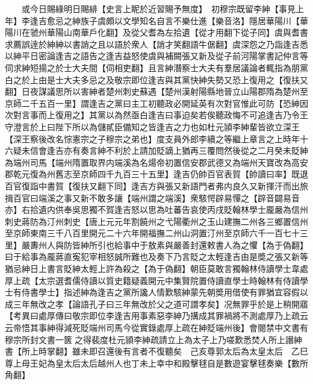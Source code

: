 　　或今日賜綠明日賜緋【史言上眤於近習賜予無度】　初穆宗既留李紳【事見上年】李逢吉愈忌之紳族子虞頗以文學知名自言不樂仕進【樂音洛】隱居華陽川【華陽川在虢州華陽山南華戶化翻】及從父耆為左拾遺【從才用翻下從子同】虞與耆書求薦誤逹於紳紳以書誚之且以語於衆人【誚才笑翻語牛倨翻】虞深怨之乃詣逢吉悉以紳平日密論逢吉之語告之逢吉益怒使虞與補闕張又新及從子前河陽掌書記仲言等伺求紳短揚之於士大夫間【伺相吏翻】且言紳潛察士大夫有羣居議論者輒指為朋黨白之於上由是士大夫多忌之及敬宗即位逢吉與其黨快紳失勢又恐上復用之【復扶又翻】日夜謀議思所以害紳者楚州刺史蘇遇【楚州漢射陽縣地晉立山陽郡隋為楚州至京師二千五百一里】謂逢吉之黨曰主工初聽政必開延英有次對官惟此可防【恐紳因次對言事而上復用之】其黨以為然亟白逢吉曰事迫矣若俟聽政悔不可追逢吉乃令王守澄言於上曰陛下所以為儲貳臣備知之皆逢吉之力也如杜元頴李紳輩皆欲立深王【深王察後改名悰憲宗之子穆宗之弟也】度支員外郎李續之等繼上章言之上時年十六疑未信會逢吉亦有奏言紳不利於上請加貶謫上猶再三覆問然後從之二月癸未貶紳為端州司馬【端州隋置取界内端溪為名煬帝初置信安郡武德又為端州天寶改為高安郡乾元復為州舊志至京師四千九百三十五里】逢吉仍帥百官表賀【帥讀曰率】既退百官復詣中書賀【復扶又翻下同】逢吉方與張又新語門者弗内良久又新揮汗而出旅揖百官曰端溪之事又新不敢多讓【端州謂之端溪】衆駭愕辟易憚之【辟音闢易音亦】右拾遺内供奉吳思獨不賀逢吉怒以思為吐蕃告哀使丙戌貶翰林學士龎嚴為信州刺史蔣防為汀州刺史【唐上元元年割饒州之弋陽衢州之玉山建撫二州各三鄉置信州至京師東南三千八百里開元二十六年開福撫二州山洞置汀州至京師六千一百七十三里】嚴夀州人與防皆紳所引也給事中于敖素與嚴善封還敕書人為之懼【為于偽翻】曰于給事為龎蔣直寃犯宰相怒誠所難也及奏下乃言貶之太輕逢吉由是奬之張又新等猶忌紳日上書言貶紳太輕上許為殺之【為于偽翻】朝臣莫敢言獨翰林侍讀學士韋處厚上疏【太宗選耆儒侍讀以質史籍疑義開元中集賢院置侍讀直學士時翰林有侍讀學士有侍書學士】指述紳為逢吉之黨所讒人情歎駭紳蒙先朝奬用借使有罪猶宜容假以成三年無改之孝【論語孔子曰三年無改於父之道可謂孝矣】况無罪乎於是上稍開寤　【考異曰處厚傳曰敬宗即位李逢吉用事素惡李紳乃搆成其罪禍將不測處厚乃上疏云云帝悟其事紳得減死貶端州司馬今從實錄處厚上疏在紳貶端州後】會閱禁中文書有穆宗所封文書一篋之得裴度杜元頴李紳疏請立上為太子上乃嗟歎悉焚人所上譖紳書【所上時掌翻】雖未即召還後有言者不復聽矣　己亥尊郭太后為太皇太后　乙巳尊上母王妃為皇太后太后越州人也丁未上幸中和殿擊毬自是數遊宴擊毬奏樂【數所角翻】

